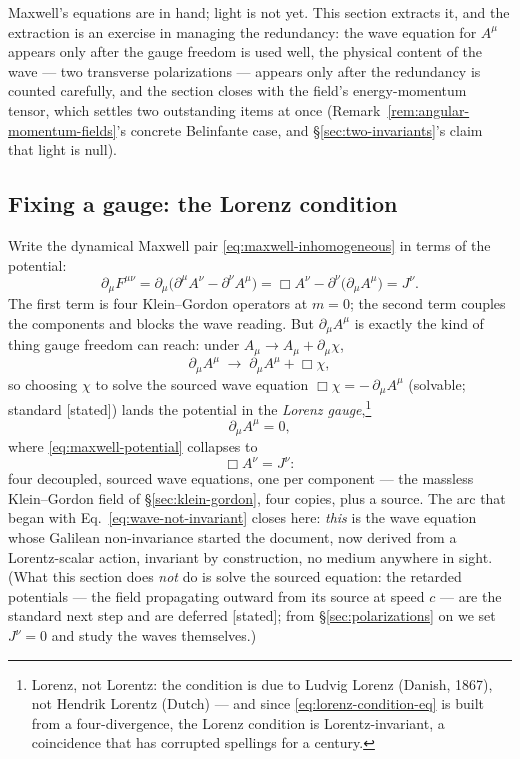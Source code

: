 \documentclass[11pt]{article}
\theoremstyle{plain}
\theoremstyle{definition}
\theoremstyle{remark}
\begin{document}
Maxwell's equations are in hand; light is not yet. This section
extracts it, and the extraction is an exercise in managing the
redundancy: the wave equation for $A^\mu$ appears only after the
gauge freedom is used well, the physical content of the wave ---
two transverse polarizations --- appears only after the redundancy is
counted carefully, and the section closes with the field's
energy-momentum tensor, which settles two outstanding items at once
(Remark~\ref{rem:angular-momentum-fields}'s concrete Belinfante case,
and \S\ref{sec:two-invariants}'s claim that light is null).

\subsection{Fixing a gauge: the Lorenz condition}
\label{sec:lorenz-gauge}

Write the dynamical Maxwell pair \eqref{eq:maxwell-inhomogeneous} in
terms of the potential:
\begin{equation}
  \partial_\mu F^{\mu\nu}
  = \partial_\mu\bigl(\partial^\mu A^\nu - \partial^\nu A^\mu\bigr)
  = \Box A^\nu - \partial^\nu\bigl(\partial_\mu A^\mu\bigr)
  = J^\nu .
  \label{eq:maxwell-potential}
\end{equation}
The first term is four Klein--Gordon operators at $m = 0$; the second
term couples the components and blocks the wave reading. But
$\partial_\mu A^\mu$ is exactly the kind of thing gauge freedom can
reach: under $A_\mu \to A_\mu + \partial_\mu\chi$,
\begin{equation}
  \partial_\mu A^\mu \;\longrightarrow\;
  \partial_\mu A^\mu + \Box\chi ,
\end{equation}
so choosing $\chi$ to solve the sourced wave equation
$\Box\chi = -\,\partial_\mu A^\mu$ (solvable; standard [stated])
lands the potential in the \emph{Lorenz gauge},\footnote{Lorenz, not
Lorentz: the condition is due to Ludvig Lorenz (Danish, 1867), not
Hendrik Lorentz (Dutch) --- and since \eqref{eq:lorenz-condition-eq}
is built from a four-divergence, the Lorenz condition is
Lorentz-invariant, a coincidence that has corrupted spellings for a
century.}
\begin{equation}
  \partial_\mu A^\mu = 0 ,
  \label{eq:lorenz-condition-eq}
\end{equation}
where \eqref{eq:maxwell-potential} collapses to
\begin{equation}
  \boxed{\;
  \Box A^\nu = J^\nu :
  \;}
  \label{eq:wave-eq-A}
\end{equation}
four decoupled, sourced wave equations, one per component --- the
massless Klein--Gordon field of \S\ref{sec:klein-gordon}, four
copies, plus a source. The arc that began with
Eq.~\eqref{eq:wave-not-invariant} closes here: \emph{this} is the
wave equation whose Galilean non-invariance started the document, now
derived from a Lorentz-scalar action, invariant by construction, no
medium anywhere in sight. (What this section does \emph{not} do is
solve the sourced equation: the retarded potentials --- the field
propagating outward from its source at speed $c$ --- are the standard
next step and are deferred [stated]; from \S\ref{sec:polarizations}
on we set $J^\nu = 0$ and study the waves themselves.)
\end{document}
